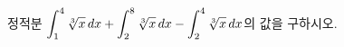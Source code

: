 정적분 $\displaystyle\int_{1}^{4}\sqrt[3]{x}\mkern3mu dx+\int_{2}^{8}\sqrt[3]{x}\mkern3mu dx-\int_{2}^{4}\sqrt[3]{x}\mkern3mu dx$의 값을 구하시오.
